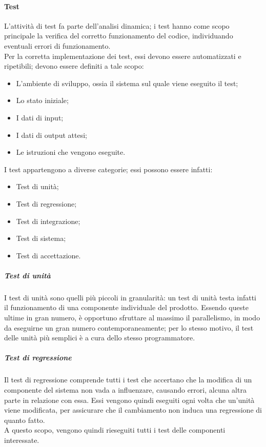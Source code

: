 \documentclass[../norme-di-progetto.tex]{subfiles}
\begin{document}
\paragraph{Test}
L'attività di test fa parte dell'analisi dinamica; i test hanno come scopo principale la verifica del corretto funzionamento del codice, individuando eventuali errori di funzionamento. \\
Per la corretta implementazione dei test, essi devono essere automatizzati e ripetibili; devono essere definiti a tale scopo:
\begin{itemize}
  \item L'ambiente di sviluppo, ossia il sistema sul quale viene eseguito il test;
  \item Lo stato iniziale;
  \item I dati di input;
  \item I dati di output attesi;
  \item Le istruzioni che vengono eseguite.
\end{itemize}
I test appartengono a diverse categorie; essi possono essere infatti:
\begin{itemize}
  \item Test di unità;
  \item Test di regressione;
  \item Test di integrazione;
  \item Test di sistema;
  \item Test di accettazione.
\end{itemize}

\subparagraph*{Test di unità}
I test di unità sono quelli più piccoli in granularità: un test di unità testa infatti il funzionamento di una componente individuale del prodotto. Essendo queste ultime in gran numero, è opportuno sfruttare al massimo il parallelismo, in modo da eseguirne un gran numero contemporaneamente; per lo stesso motivo, il test delle unità più semplici è a cura dello stesso programmatore.

\subparagraph*{Test di regressione}
Il test di regressione comprende tutti i test che accertano che la modifica di un componente del sistema non vada a influenzare, causando errori, alcuna altra parte in relazione con essa. Essi vengono quindi eseguiti ogni volta che un'unità viene modificata, per assicurare che il cambiamento non induca una regressione di quanto fatto. \\
A questo scopo, vengono quindi rieseguiti tutti i test delle componenti interessate.
\end{document}
